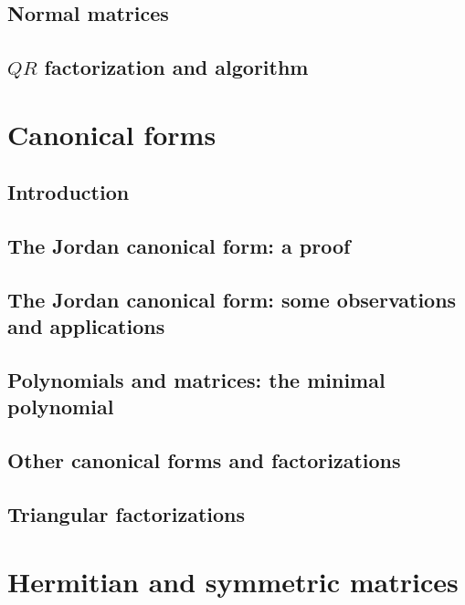 \documentclass[a4paper]{article}
\newcommand{\todobox}{\textcolor{red}{\fbox{\phantom{--}}}}
\begin{document}
\subsection{Normal matrices}
\todobox
\subsection{$QR$ factorization and algorithm}
\todobox

\newpage
\section{Canonical forms}
\setcounter{subsection}{-1}
\subsection{Introduction}
\todobox
\subsection{The Jordan canonical form: a proof}
\todobox
\subsection{The Jordan canonical form: some observations and applications}
\todobox
\subsection{Polynomials and matrices: the minimal polynomial}
\todobox
\subsection{Other canonical forms and factorizations}
\todobox
\subsection{Triangular factorizations}
\todobox

\newpage
\section{Hermitian and symmetric matrices}
\setcounter{subsection}{-1}
\end{document}
